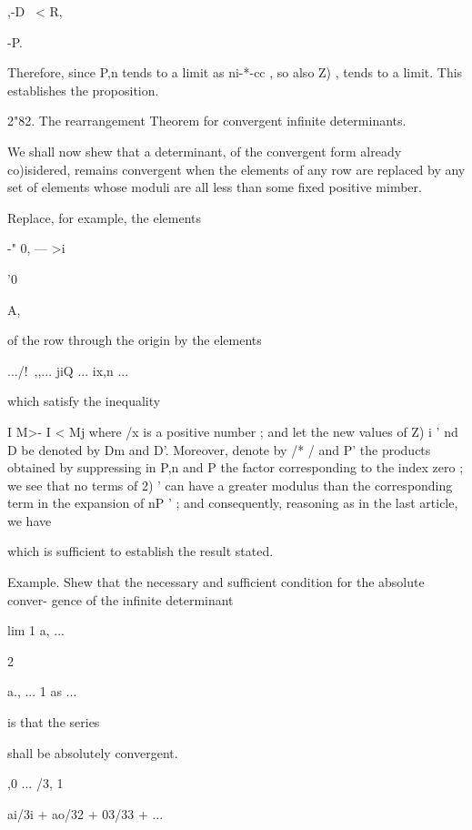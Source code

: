 ,-D \ < R, 



-P. 



Therefore, since P,n tends to a limit as ni-*-cc , so also Z) , tends to a limit. This 
establishes the proposition. 

2"82. The rearrangement Theorem for convergent infinite determinants. 

We shall now shew that a determinant, of the convergent form already co)isidered, 
remains convergent when the elements of any row are replaced by any set of elements whose 
moduli are all less than some fixed positive mimber. 

Replace, for example, the elements 



-"  0, — >i 



'0 



A, 



of the row through the origin by the elements 

.../!\  ,,... jiQ ... ix,n ... 

which satisfy the inequality 

I M>- I < Mj 
where /x is a positive number ; and let the new values of Z) i ' nd D be denoted by 
Dm and D'. Moreover, denote by /* / and P' the products obtained by suppressing in 
P,n and P the factor corresponding to the index zero ; we see that no terms of 2) ' can 
have a greater modulus than the corresponding term in the expansion of nP ' ; and 
consequently, reasoning as in the last article, we have 

which is sufficient to establish the result stated. 

Example. Shew that the necessary and sufficient condition for the absolute conver- 
gence of the infinite determinant 

lim 1 a, ... 



 2 



a.,  ... 
1 as ... 



is that the series 

shall be absolutely convergent. 



,0 ... /3,  1 

ai/3i + ao/32 + 03/33 + ... 



